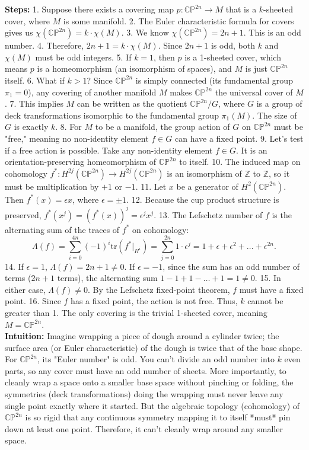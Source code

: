 \begin{solution}
\textbf{Steps:}
1. Suppose there exists a covering map $p: \mathbb{CP}^{2n} \to M$ that is a $k$-sheeted cover, where $M$ is some manifold.
2. The Euler characteristic formula for covers gives us $\chi(\mathbb{CP}^{2n}) = k \cdot \chi(M)$.
3. We know $\chi(\mathbb{CP}^{2n}) = 2n+1$. This is an odd number.
4. Therefore, $2n+1 = k \cdot \chi(M)$. Since $2n+1$ is odd, both $k$ and $\chi(M)$ must be odd integers.
5. If $k = 1$, then $p$ is a 1-sheeted cover, which means $p$ is a homeomorphism (an isomorphism of spaces), and $M$ is just $\mathbb{CP}^{2n}$ itself.
6. What if $k > 1$? Since $\mathbb{CP}^{2n}$ is simply connected (its fundamental group $\pi_1 = 0$), any covering of another manifold $M$ makes $\mathbb{CP}^{2n}$ the universal cover of $M$.
7. This implies $M$ can be written as the quotient $\mathbb{CP}^{2n} / G$, where $G$ is a group of deck transformations isomorphic to the fundamental group $\pi_1(M)$. The size of $G$ is exactly $k$.
8. For $M$ to be a manifold, the group action of $G$ on $\mathbb{CP}^{2n}$ must be "free," meaning no non-identity element $f \in G$ can have a fixed point.
9. Let's test if a free action is possible. Take any non-identity element $f \in G$. It is an orientation-preserving homeomorphism of $\mathbb{CP}^{2n}$ to itself.
10. The induced map on cohomology $f^*: H^{2j}(\mathbb{CP}^{2n}) \to H^{2j}(\mathbb{CP}^{2n})$ is an isomorphism of $\mathbb{Z}$ to $\mathbb{Z}$, so it must be multiplication by $+1$ or $-1$.
11. Let $x$ be a generator of $H^2(\mathbb{CP}^{2n})$. Then $f^*(x) = \epsilon x$, where $\epsilon = \pm 1$.
12. Because the cup product structure is preserved, $f^*(x^j) = (f^*(x))^j = \epsilon^j x^j$.
13. The Lefschetz number of $f$ is the alternating sum of the traces of $f^*$ on cohomology:
    \[ \Lambda(f) = \sum_{i=0}^{4n} (-1)^i \text{tr}(f^*|_{H^i}) = \sum_{j=0}^{2n} 1 \cdot \epsilon^j = 1 + \epsilon + \epsilon^2 + \dots + \epsilon^{2n}. \]
14. If $\epsilon = 1$, $\Lambda(f) = 2n+1 \neq 0$. If $\epsilon = -1$, since the sum has an odd number of terms ($2n+1$ terms), the alternating sum $1 - 1 + 1 - \dots + 1 = 1 \neq 0$.
15. In either case, $\Lambda(f) \neq 0$. By the Lefschetz fixed-point theorem, $f$ must have a fixed point.
16. Since $f$ has a fixed point, the action is not free. Thus, $k$ cannot be greater than 1. The only covering is the trivial 1-sheeted cover, meaning $M = \mathbb{CP}^{2n}$.\\[2ex]

\textbf{Intuition:}
Imagine wrapping a piece of dough around a cylinder twice; the surface area (or Euler characteristic) of the dough is twice that of the base shape. For $\mathbb{CP}^{2n}$, its "Euler number" is odd. You can't divide an odd number into $k$ even parts, so any cover must have an odd number of sheets. More importantly, to cleanly wrap a space onto a smaller base space without pinching or folding, the symmetries (deck transformations) doing the wrapping must never leave any single point exactly where it started. But the algebraic topology (cohomology) of $\mathbb{CP}^{2n}$ is so rigid that any continuous symmetry mapping it to itself *must* pin down at least one point. Therefore, it can't cleanly wrap around any smaller space.
\end{solution}


